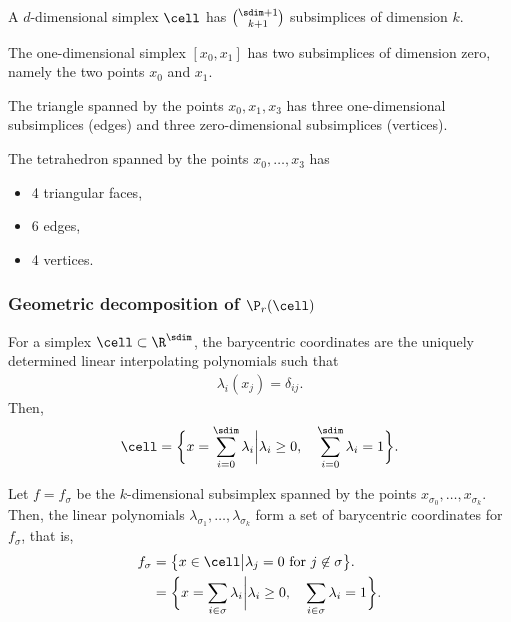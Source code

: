 \begin{example}
  A $d$-dimensional simplex $\cell$ has $\binom{\sdim+1}{k+1}$
  subsimplices of dimension $k$.

  The one-dimensional simplex $[x_0,x_1]$ has two subsimplices of
  dimension zero, namely the two points $x_0$ and $x_1$.

  The triangle spanned by the points $x_0, x_1, x_3$ has three
  one-dimensional subsimplices (edges) and three zero-dimensional
  subsimplices (vertices).

  The tetrahedron spanned by the points $x_0,\dots,x_3$ has
  \begin{itemize}
  \item 4 triangular faces,
  \item 6 edges,
  \item 4 vertices.
  \end{itemize}
\end{example}

\subsubsection{Geometric decomposition of $\P_r(\cell)$}

\begin{remark}
  For a simplex $\cell\subset\R^\sdim$, the barycentric coordinates are
  the uniquely determined linear interpolating polynomials such that
  \begin{gather}
    \lambda_i(x_j) = \delta_{ij}.
  \end{gather}
  Then,
  \begin{gather}
    \cell = \biggl\{ x = \sum_{i=0}^\sdim\lambda_i\bigg\vert
    \lambda_i \ge 0,\quad\sum_{i=0}^\sdim\lambda_i = 1\biggr\}.
  \end{gather}

  Let $f=f_\sigma$ be the $k$-dimensional subsimplex spanned by the
  points $x_{\sigma_0},\dots,x_{\sigma_k}$. Then, the linear
  polynomials $\lambda_{\sigma_1},\dots,\lambda_{\sigma_k}$ form a set
  of barycentric coordinates for $f_\sigma$, that is,
  \begin{gather}
    \begin{split}
      f_\sigma &= \bigl\{x\in\cell \big\vert
      \lambda_j=0 \text{ for } j\not\in\sigma\bigr\}.
      \\
      &= \biggl\{ x = \sum_{i\in\sigma}\lambda_i\bigg\vert
    \lambda_i \ge 0,\quad\sum_{i\in\sigma}\lambda_i = 1\biggr\}.
    \end{split}
  \end{gather}
\end{remark}

